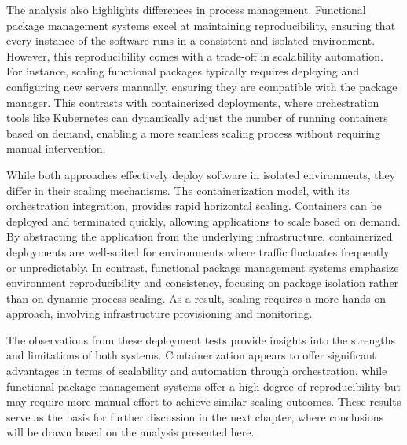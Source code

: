 The analysis also highlights differences in process management. Functional package management
systems excel at maintaining reproducibility, ensuring that every instance of the software runs
in a consistent and isolated environment. However, this reproducibility comes with a trade-off
in scalability automation. For instance, scaling functional packages typically requires
deploying and configuring new servers manually, ensuring they are compatible with the package
manager. This contrasts with containerized deployments, where orchestration tools like Kubernetes
can dynamically adjust the number of running containers based on demand, enabling a more seamless
scaling process without requiring manual intervention.

While both approaches effectively deploy software in isolated environments, they differ in their
scaling mechanisms. The containerization model, with its orchestration integration, provides
rapid horizontal scaling. Containers can be deployed and terminated quickly, allowing applications
to scale based on demand. By abstracting the application from the underlying infrastructure,
containerized deployments are well-suited for environments where traffic fluctuates frequently
or unpredictably. In contrast, functional package management systems emphasize environment
reproducibility and consistency, focusing on package isolation rather than on dynamic process
scaling. As a result, scaling requires a more hands-on approach, involving infrastructure
provisioning and monitoring.

The observations from these deployment tests provide insights into the strengths and limitations
of both systems. Containerization appears to offer significant advantages in terms of scalability
and automation through orchestration, while functional package management systems offer
a high degree of reproducibility but may require more manual effort to achieve similar scaling
outcomes. These results serve as the basis for further discussion in the next chapter, where
conclusions will be drawn based on the analysis presented here.
